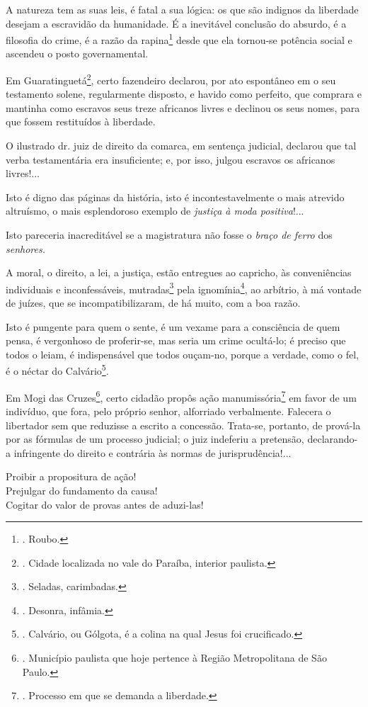 A natureza tem as suas leis, é fatal a sua lógica: os que são indignos
da liberdade desejam a escravidão da humanidade. É a inevitável
conclusão do absurdo, é a filosofia do crime, é a razão da
rapina\footnote{. Roubo.} desde que ela tornou-se potência social e
ascendeu o posto governamental.

Em Guaratinguetá\footnote{. Cidade localizada no vale do Paraíba,
  interior paulista.}, certo fazendeiro declarou, por ato espontâneo em
o seu testamento solene, regularmente disposto, e havido como perfeito,
que comprara e mantinha como escravos seus treze africanos livres e
declinou os seus nomes, para que fossem restituídos à liberdade.

O ilustrado dr. juiz de direito da comarca, em sentença judicial,
declarou que tal verba testamentária era insuficiente; e, por isso,
julgou escravos os africanos livres!...

Isto é digno das páginas da história, isto é incontestavelmente o mais
atrevido altruísmo, o mais esplendoroso exemplo de \emph{justiça à moda
positiva}!...

Isto pareceria inacreditável se a magistratura não fosse o \emph{braço
de ferro} dos \emph{senhores.}

A moral, o direito, a lei, a justiça, estão entregues ao capricho, às
conveniências individuais e inconfessáveis, mutradas\footnote{. Seladas,
  carimbadas.} pela ignomínia\footnote{. Desonra, infâmia.}, ao
arbítrio, à má vontade de juízes, que se incompatibilizaram, de há
muito, com a boa razão.

Isto é pungente para quem o sente, é um vexame para a consciência de
quem pensa, é vergonhoso de proferir-se, mas seria um crime ocultá-lo; é
preciso que todos o leiam, é indispensável que todos ouçam-no, porque a
verdade, como o fel, é o néctar do Calvário\footnote{. Calvário, ou
  Gólgota, é a colina na qual Jesus foi crucificado.}.

Em Mogi das Cruzes\footnote{. Município paulista que hoje pertence à
  Região Metropolitana de São Paulo.}, certo cidadão propôs ação
manumissória\footnote{. Processo em que se demanda a liberdade.} em
favor de um indivíduo, que fora, pelo próprio senhor, alforriado
verbalmente. Falecera o libertador sem que reduzisse a escrito a
concessão. Trata-se, portanto, de prová-la por as fórmulas de um
processo judicial; o juiz indeferiu a pretensão, declarando-a
infringente do direito e contrária às normas de jurisprudência!...

Proibir a propositura de ação!\\
Prejulgar do fundamento da causa!\\
Cogitar do valor de provas antes de aduzi-las!

